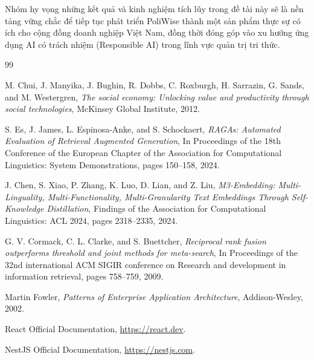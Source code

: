\documentclass[12pt,a4paper]{report}
\begin{document}
Nhóm hy vọng những kết quả và kinh nghiệm tích lũy trong đề tài này sẽ là nền tảng vững chắc để tiếp tục phát triển PoliWise thành một sản phẩm thực sự có ích cho cộng đồng doanh nghiệp Việt Nam, đồng thời đóng góp vào xu hướng ứng dụng AI có trách nhiệm (Responsible AI) trong lĩnh vực quản trị tri thức.

\clearpage

{}

\renewcommand{\bibname}{TÀI LIỆU THAM KHẢO}

\begin{thebibliography}{99}

M. Chui, J. Manyika, J. Bughin, R. Dobbs, C. Roxburgh, H. Sarrazin, G. Sands, and M. Westergren,
\textit{The social economy: Unlocking value and productivity through social technologies},
McKinsey Global Institute, 2012.

S. Es, J. James, L. Espinosa-Anke, and S. Schockaert,
\textit{RAGAs: Automated Evaluation of Retrieval Augmented Generation},
In Proceedings of the 18th Conference of the European Chapter of the Association for Computational Linguistics: System Demonstrations, pages 150--158, 2024.

J. Chen, S. Xiao, P. Zhang, K. Luo, D. Lian, and Z. Liu,
\textit{M3-Embedding: Multi-Linguality, Multi-Functionality, Multi-Granularity Text Embeddings Through Self-Knowledge Distillation},
Findings of the Association for Computational Linguistics: ACL 2024, pages 2318--2335, 2024.

G. V. Cormack, C. L. Clarke, and S. Buettcher,
\textit{Reciprocal rank fusion outperforms threshold and joint methods for meta-search},
In Proceedings of the 32nd international ACM SIGIR conference on Research and development in information retrieval, pages 758--759, 2009.

Martin Fowler,
\textit{Patterns of Enterprise Application Architecture},
Addison-Wesley, 2002.

React Official Documentation,
\url{https://react.dev}.

NestJS Official Documentation,
\url{https://nestjs.com}.

\end{thebibliography}
\end{document}
